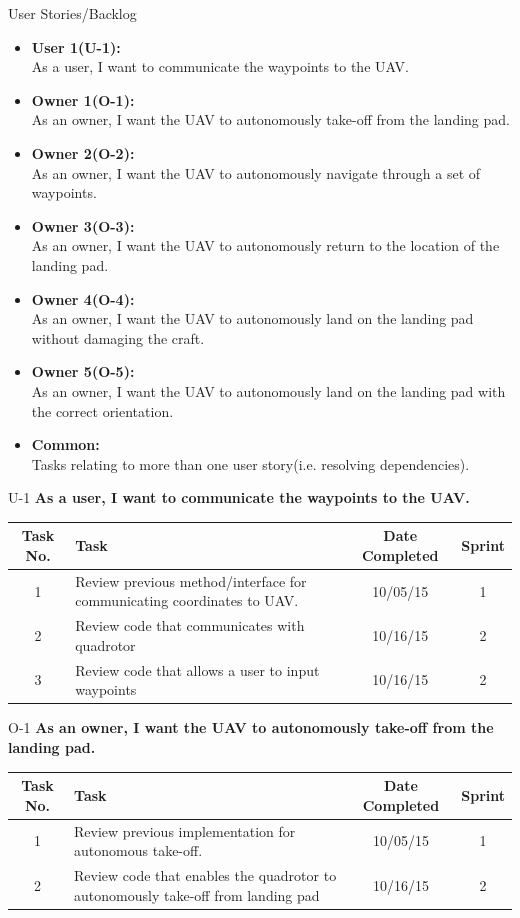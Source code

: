 \documentclass[11pt]{beamer}
\begin{document}
\begin{frame}{User Stories/Backlog}

\begin{itemize}
\item \textbf{User 1(U-1):}\\ As a user, I want to communicate the waypoints to the UAV.
\item \textbf{Owner 1(O-1):}\\ As an owner, I want the UAV to autonomously take-off from the landing pad.
\item \textbf{Owner 2(O-2):}\\ As an owner, I want the UAV to autonomously navigate through a set of waypoints.
\item \textbf{Owner 3(O-3):}\\ As an owner, I want the UAV to autonomously return to the location of the landing pad.
\item \textbf{Owner 4(O-4):}\\ As an owner, I want the UAV to autonomously land on the landing pad without damaging the craft.
\item \textbf{Owner 5(O-5):}\\ As an owner, I want the UAV to autonomously land on the landing pad with the correct orientation.
\item \textbf{Common:}\\ Tasks relating to more than one user story(i.e. resolving dependencies).
\end{itemize}

\end{frame}

\begin{frame}{U-1}
\textbf{As a user, I want to communicate the waypoints to the UAV.}
\begin{tabular}{| c | >{\raggedright}m{4cm} | c | c |}\hline
Task No. & Task & Date Completed & Sprint\\\hline
1 & Review previous method/interface for communicating coordinates to UAV. & 10/05/15 & 1 \\\hline
2 & Review code that communicates with quadrotor & 10/16/15 & 2 \\\hline
3 & Review code that allows a user to input waypoints & 10/16/15 & 2\\\hline

\end{tabular}
\end{frame}


\begin{frame}{O-1}
\textbf{As an owner, I want the UAV to autonomously take-off from the landing pad.}
\begin{tabular}{| c | >{\raggedright}m{4cm} | c | c |}\hline
Task No. & Task & Date Completed & Sprint\\\hline
1 & Review previous implementation for autonomous take-off. & 10/05/15 & 1 \\\hline
2 & Review code that enables the quadrotor to autonomously take-off from landing pad & 10/16/15 & 2 \\\hline

\end{tabular}
\end{frame}
\end{document}
